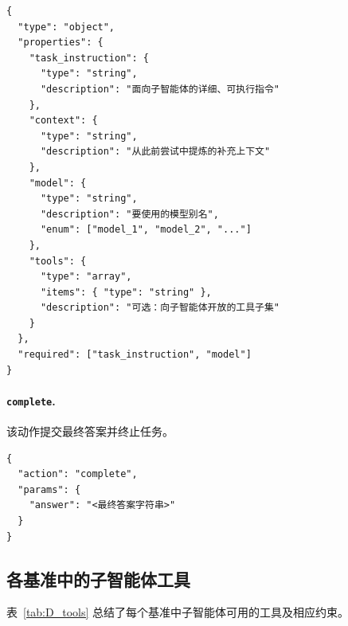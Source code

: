 \begin{tcolorbox}[title={\textbf{\small 动作模式：delegate\_task}},
  boxrule=1pt, arc=0mm,
  colback=gray!5,
  colframe=gray!70,
  breakable, before skip=6pt, after skip=10pt,
  pad at break=2mm, parbox=false]
\begin{verbatim}
{
  "type": "object",
  "properties": {
    "task_instruction": {
      "type": "string",
      "description": "面向子智能体的详细、可执行指令"
    },
    "context": {
      "type": "string",
      "description": "从此前尝试中提炼的补充上下文"
    },
    "model": {
      "type": "string",
      "description": "要使用的模型别名",
      "enum": ["model_1", "model_2", "..."]
    },
    "tools": {
      "type": "array",
      "items": { "type": "string" },
      "description": "可选：向子智能体开放的工具子集"
    }
  },
  "required": ["task_instruction", "model"]
}
\end{verbatim}
\end{tcolorbox}

\paragraph{\texttt{complete}.}
该动作提交最终答案并终止任务。

\begin{tcolorbox}[title={\textbf{\small 动作：complete}},
  boxrule=1pt, arc=0mm,
  colback=gray!5,
  colframe=gray!70,
  breakable, before skip=6pt, after skip=10pt,
  pad at break=2mm, parbox=false]
\begin{verbatim}
{
  "action": "complete",
  "params": {
    "answer": "<最终答案字符串>"
  }
}
\end{verbatim}
\end{tcolorbox}

\subsection{各基准中的子智能体工具}
\label{app:tools}
表~\ref{tab:D_tools} 总结了每个基准中子智能体可用的工具及相应约束。

